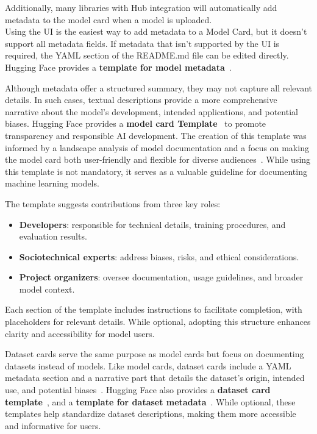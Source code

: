 \documentclass[12pt,a4paper, oneside, openright]{book}
\begin{document}
Additionally, many libraries with Hub integration will automatically add metadata to the model card when a model is uploaded.\\
Using the UI is the easiest way to add metadata to a Model Card, but it doesn’t support all metadata fields. If metadata that isn’t supported by the UI is required, the YAML section of the README.md file can be edited directly.
Hugging Face provides a \textbf{template for model metadata}~\cite{hf_model_card_metadata}.

Although metadata offer a structured summary, they may not capture all relevant details. In such cases, textual descriptions provide a more comprehensive narrative about the model's development, intended applications, and potential biases.
Hugging Face provides a \textbf{model card Template}~\cite{hf_model_card_template} to promote transparency and responsible AI development.
The creation of this template was informed by a landscape analysis of model documentation and a focus on making the model card both user-friendly and flexible for diverse audiences~\cite{ huggingface_model_card_guidebook}.
While using this template is not mandatory, it serves as a valuable guideline for documenting machine learning models.

The template suggests contributions from three key roles:
\begin{itemize}
    \item \textbf{Developers}: responsible for technical details, training procedures, and evaluation results.
    \item \textbf{Sociotechnical experts}: address biases, risks, and ethical considerations.
    \item \textbf{Project organizers}: oversee documentation, usage guidelines, and broader model context.
\end{itemize}
Each section of the template includes instructions to facilitate completion, with placeholders for relevant details. While optional, adopting this structure enhances clarity and accessibility for model users.

Dataset cards serve the same purpose as model cards but focus on documenting datasets instead of models. Like model cards, dataset cards include a YAML metadata section and a narrative part that details the dataset’s origin, intended use, and potential biases~\cite{huggingface_datasets}.
Hugging Face also provides a \textbf{dataset card template}~\cite{hf_DatasetCardTemplate},  and a \textbf{template for dataset metadata}~\cite{hf_DatasetCard_metadata}.  While optional, these templates help standardize dataset descriptions, making them more accessible and informative for users.
\end{document}
